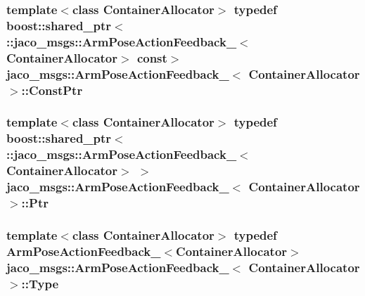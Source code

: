 \subsubsection[{\texorpdfstring{Const\+Ptr}{ConstPtr}}]{\setlength{\rightskip}{0pt plus 5cm}template$<$class Container\+Allocator$>$ typedef boost\+::shared\+\_\+ptr$<$ \+::{\bf jaco\+\_\+msgs\+::\+Arm\+Pose\+Action\+Feedback\+\_\+}$<$Container\+Allocator$>$ const$>$ {\bf jaco\+\_\+msgs\+::\+Arm\+Pose\+Action\+Feedback\+\_\+}$<$ Container\+Allocator $>$\+::{\bf Const\+Ptr}}\hypertarget{structjaco__msgs_1_1ArmPoseActionFeedback___a84666f98ea7faef88c0635f1d3fc3764}{}\label{structjaco__msgs_1_1ArmPoseActionFeedback___a84666f98ea7faef88c0635f1d3fc3764}
\subsubsection[{\texorpdfstring{Ptr}{Ptr}}]{\setlength{\rightskip}{0pt plus 5cm}template$<$class Container\+Allocator$>$ typedef boost\+::shared\+\_\+ptr$<$ \+::{\bf jaco\+\_\+msgs\+::\+Arm\+Pose\+Action\+Feedback\+\_\+}$<$Container\+Allocator$>$ $>$ {\bf jaco\+\_\+msgs\+::\+Arm\+Pose\+Action\+Feedback\+\_\+}$<$ Container\+Allocator $>$\+::{\bf Ptr}}\hypertarget{structjaco__msgs_1_1ArmPoseActionFeedback___a54f785714afb578d9d16baf67ceabc43}{}\label{structjaco__msgs_1_1ArmPoseActionFeedback___a54f785714afb578d9d16baf67ceabc43}
\subsubsection[{\texorpdfstring{Type}{Type}}]{\setlength{\rightskip}{0pt plus 5cm}template$<$class Container\+Allocator$>$ typedef {\bf Arm\+Pose\+Action\+Feedback\+\_\+}$<$Container\+Allocator$>$ {\bf jaco\+\_\+msgs\+::\+Arm\+Pose\+Action\+Feedback\+\_\+}$<$ Container\+Allocator $>$\+::{\bf Type}}\hypertarget{structjaco__msgs_1_1ArmPoseActionFeedback___af499dd5bc5714c5deb46e50cada0b720}{}\label{structjaco__msgs_1_1ArmPoseActionFeedback___af499dd5bc5714c5deb46e50cada0b720}


